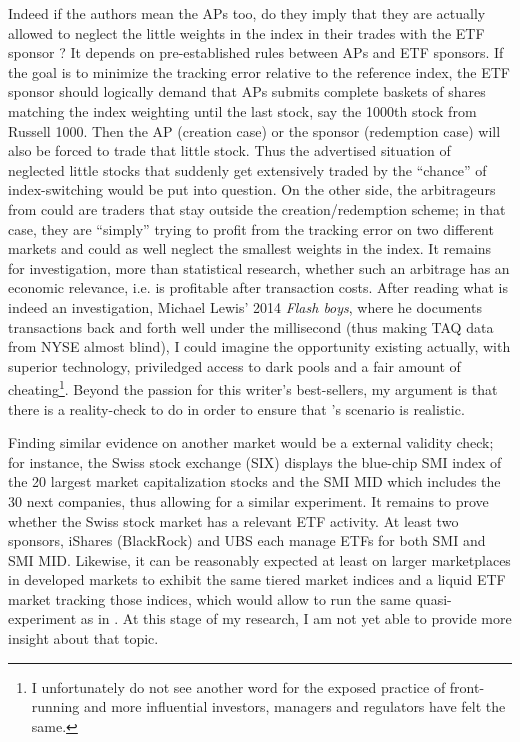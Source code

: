 \documentclass[a4paper, twoside, listof=totoc, toc=sectionentrywithdots]{scrartcl}
\begin{document}
Indeed if the authors mean the APs too, do they imply that they are actually allowed to neglect the little weights in the index in their trades with the ETF sponsor ? It depends on pre-established rules between APs and ETF sponsors. If the goal is to minimize the tracking error relative to the reference index, the ETF sponsor should logically demand that APs submits complete baskets of shares matching the index weighting until the last stock, say the 1000th stock from Russell 1000. Then the AP (creation case) or the sponsor (redemption case) will also be forced to trade that little stock. Thus the advertised situation of neglected little stocks that suddenly get extensively traded by the ``chance'' of index-switching would be put into question. On the other side, the arbitrageurs from \cite{Ben-David2018} could are traders that stay outside the creation/redemption scheme; in that case, they are ``simply'' trying to profit from the tracking error on two different markets and could as well neglect the smallest weights in the index. It remains for investigation, more than statistical research, whether such an arbitrage has an economic relevance, i.e. is profitable after transaction costs. After reading what is indeed an investigation, Michael Lewis' 2014 \textit{Flash boys}, where he documents transactions back and forth well under the millisecond (thus making TAQ data from NYSE almost blind), I could imagine the opportunity existing actually, with superior technology, priviledged access to dark pools and a fair amount of cheating\footnote{I unfortunately do not see another word for the exposed practice of front-running and more influential investors, managers and regulators have felt the same.}. Beyond the passion for this writer's best-sellers, my argument is that there is a reality-check to do in order to ensure that \cite{Ben-David2018}'s scenario is realistic.

Finding similar evidence on another market would be a external validity check; for instance, the Swiss stock exchange (SIX) displays the blue-chip SMI index of the 20 largest market capitalization stocks and the SMI MID which includes the 30 next companies, thus allowing for a similar experiment. It remains to prove whether the Swiss stock market has a relevant ETF activity. At least two sponsors, iShares (BlackRock) and UBS each manage ETFs for both SMI and SMI MID. Likewise, it can be reasonably expected at least on larger marketplaces in developed markets to exhibit the same tiered market indices and a liquid ETF market tracking those indices, which would allow to run the same quasi-experiment as in \cite{Ben-David2018}. At this stage of my research, I am not yet able to provide more insight about that topic.
\end{document}
